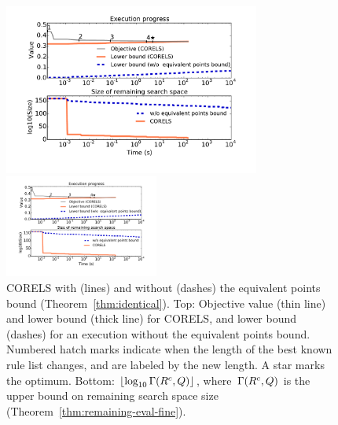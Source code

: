 \begin{figure}[t!]
\begin{center}
\begin{arxiv}
\includegraphics[trim={20mm, 15mm, 24mm, 15mm},
width=0.75\textwidth]{figs/compas_execution-remaining-space.pdf}
\end{arxiv}
\begin{kdd}
\includegraphics[trim={20mm, 25mm, 24mm, 15mm}, width=0.45\textwidth]{figs/compas_execution-remaining-space.pdf}
\end{kdd}
\end{center}
\caption{CORELS with (lines) and without
(dashes) the equivalent points bound (Theorem~\ref{thm:identical}).
%
%
Top: Objective value (thin line) and lower bound (thick line) for CORELS,
and lower bound (dashes) for an execution without the equivalent points bound.
%
Numbered hatch marks
indicate when the length of the best known rule list changes,
and are labeled by the new length.
%
A star marks the optimum.
%
%
Bottom: $\lfloor \log_{10} \Gamma({R^c}, Q) \rfloor$,
where~$\Gamma({R^c}, Q)$
is the upper bound on remaining search space size
(Theorem~\ref{thm:remaining-eval-fine}).
}
\label{fig:objective}
\end{figure}

